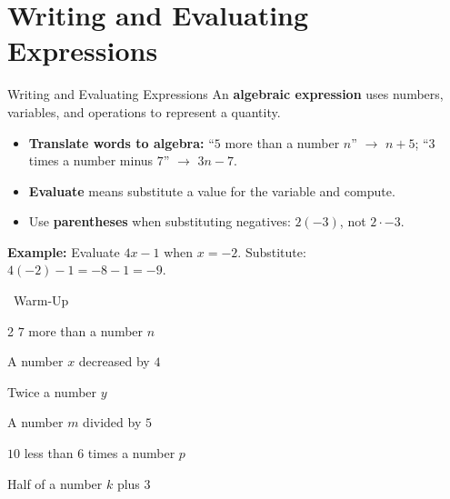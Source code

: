 \section{Writing and Evaluating Expressions}

\begin{quickReview}{Writing and Evaluating Expressions}
An \textbf{algebraic expression} uses numbers, variables, and operations to represent a quantity.

\begin{itemize}[leftmargin=*]
    \item \textbf{Translate words to algebra:} ``$5$ more than a number $n$'' $\to$ $n + 5$; \quad ``$3$ times a number minus $7$'' $\to$ $3n - 7$.
    \item \textbf{Evaluate} means substitute a value for the variable and compute.
    \item Use \textbf{parentheses} when substituting negatives: $2(-3)$, not $2 \cdot -3$.
\end{itemize}

\medskip
\textbf{Example:} Evaluate $4x - 1$ when $x = -2$. \quad Substitute: $4(-2) - 1 = -8 - 1 = -9$.
\end{quickReview}

\begin{practiceBox}[funGreen]{\faSun~Warm-Up}


\begin{multicols}{2}
\prob $7$ more than a number $n$ \answerBlank[3cm]

\prob A number $x$ decreased by $4$ \answerBlank[3cm]

\prob Twice a number $y$ \answerBlank[3cm]

\prob A number $m$ divided by $5$ \answerBlank[3cm]

\prob $10$ less than $6$ times a number $p$ \answerBlank[3cm]

\prob Half of a number $k$ plus $3$ \answerBlank[3cm]
\end{multicols}
\end{practiceBox}

